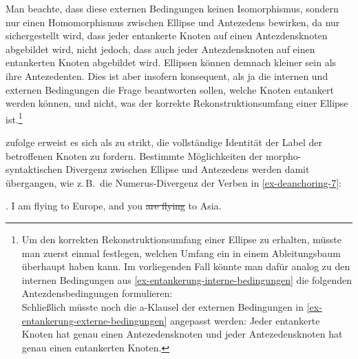 Man beachte, dass diese externen Bedingungen keinen Isomorphismus, sondern nur einen Homomorphismus zwischen Ellipse und Antezedens bewirken, da nur sichergestellt wird, dass jeder entankerte Knoten auf einen Antezdensknoten abgebildet wird, nicht jedoch, dass auch jeder Antezdensknoten auf einen entankerten Knoten abgebildet wird. Ellipsen können demnach kleiner sein als ihre Antezedenten. Dies ist aber insofern konsequent, als ja die internen und externen Bedingungen die Frage beantworten sollen, welche Knoten entankert werden können, und  nicht, was der korrekte Rekonstruktionsumfang einer Ellipse ist.\footnote{Um den korrekten Rekonstruktionsumfang einer Ellipse zu erhalten, müsste man zuerst einmal festlegen, welchen Umfang ein  in einem Ableitungsbaum überhaupt haben kann. Im vorliegenden Fall könnte man dafür analog zu den internen Bedingungen aus \ref{ex-entankerung-interne-bedingungen} die folgenden Antezdensbedingungen formulieren:\\
Schlie\ss lich müsste noch die a-Klausel der externen Bedingungen in \ref{ex-entankerung-externe-bedingungen} angepasst werden: Jeder entankerte Knoten hat genau einen Antezedensknoten und jeder Antezedensknoten hat genau einen entankerten Knoten.} 

\cite{Lichte:Kallmeyer:10} zufolge erweist es sich als zu strikt, die vollständige Identität der Label der betroffenen Knoten zu fordern. Bestimmte Möglichkeiten der morpho-syntaktischen Divergenz zwischen Ellipse und Antezedens werden damit übergangen, wie z.\,B.\ die Numerus-Divergenz der Verben in \ref{ex-deanchoring-7}:  

\ex. \label{ex-deanchoring-7} I am flying to Europe, and you \sout{are flying} to Asia. \hfill \citep[(4)]{Osborne:08}

